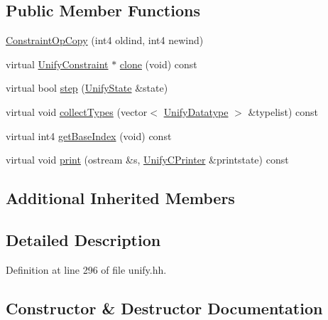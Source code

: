 \subsection*{Public Member Functions}
\begin{DoxyCompactItemize}
\item 
\mbox{\hyperlink{class_constraint_op_copy_a6b4f2b1ce01261b51a7b3fdda02be126}{Constraint\+Op\+Copy}} (int4 oldind, int4 newind)
\item 
virtual \mbox{\hyperlink{class_unify_constraint}{Unify\+Constraint}} $\ast$ \mbox{\hyperlink{class_constraint_op_copy_a849dd1a8ef637ec99dc9d067ccb1eca9}{clone}} (void) const
\item 
virtual bool \mbox{\hyperlink{class_constraint_op_copy_aae93c891f29b393a21aad701e665f63b}{step}} (\mbox{\hyperlink{class_unify_state}{Unify\+State}} \&state)
\item 
virtual void \mbox{\hyperlink{class_constraint_op_copy_a9419293afb9195630808c5b6120cd18c}{collect\+Types}} (vector$<$ \mbox{\hyperlink{class_unify_datatype}{Unify\+Datatype}} $>$ \&typelist) const
\item 
virtual int4 \mbox{\hyperlink{class_constraint_op_copy_a0b79f0fa69317b313528c537e71c2464}{get\+Base\+Index}} (void) const
\item 
virtual void \mbox{\hyperlink{class_constraint_op_copy_afc1b0335d3d29f5405914fb0b43b3418}{print}} (ostream \&s, \mbox{\hyperlink{class_unify_c_printer}{Unify\+C\+Printer}} \&printstate) const
\end{DoxyCompactItemize}
\subsection*{Additional Inherited Members}


\subsection{Detailed Description}


Definition at line 296 of file unify.\+hh.



\subsection{Constructor \& Destructor Documentation}
\mbox{\label{class_constraint_op_copy_a6b4f2b1ce01261b51a7b3fdda02be126}} 
